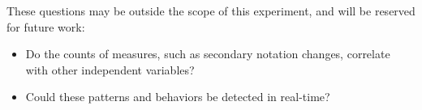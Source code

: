 These questions may be outside the scope of this experiment, and will be reserved for future work:
\begin{itemize}
\item Do the counts of measures, such as secondary notation changes, correlate with other independent variables?
\item Could these patterns and behaviors be detected in real-time?
\end{itemize}
